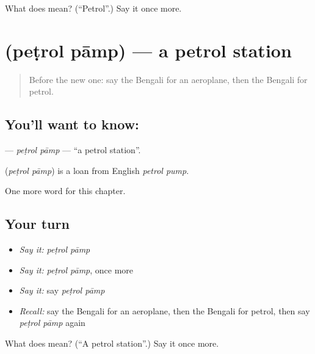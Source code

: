 \begin{tcolorbox}[breakable,colback=teal!4,colframe=teal!35!black,title={Before you move on}]
What does  mean? (\textquotedblleft{}Petrol\textquotedblright{}.) Say it once more.
\end{tcolorbox}
\section[\texorpdfstring{\bn{পেট্রোল} \bn{পাম্প} (peṭrol pāmp)}{পেট্রোল পাম্প (peṭrol pāmp)}]{  (peṭrol pāmp) — a petrol station}

\label{lesson:BN-C198-petrol-pamp}



\begin{quote}
Before the new one: say the Bengali for an aeroplane, then the Bengali for petrol.
\end{quote}

\subsection*{You'll want to know:  }
\textbf{ } — \emph{peṭrol pāmp} — \textquotedblleft{}a petrol station\textquotedblright{}.

\begin{cousinweb}
\textbf{ } (\emph{peṭrol pāmp}) is a loan from English \emph{petrol pump}.
\end{cousinweb}

\begin{grammarlens}[title={What you've built}]
One more word for this chapter.
\end{grammarlens}

\subsection*{Your turn}
\begin{itemize}
\raggedright
  \item \emph{Say it:} \emph{peṭrol pāmp}
  \item \emph{Say it:} \emph{peṭrol pāmp}, once more
  \item \emph{Say it:} say \emph{peṭrol pāmp}
  \item \emph{Recall:} say the Bengali for an aeroplane, then the Bengali for petrol, then say \emph{peṭrol pāmp} again
\end{itemize}

\begin{tcolorbox}[breakable,colback=teal!4,colframe=teal!35!black,title={Before you move on}]
What does   mean? (\textquotedblleft{}A petrol station\textquotedblright{}.) Say it once more.
\end{tcolorbox}
